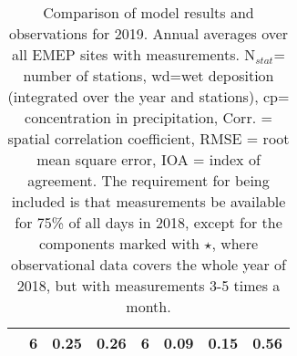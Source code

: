 \begin{table}
\begin{center}
\begin{tabular}{c|ccccccc}
   &  6  &   0.25  &   0.26 &    6 &  0.09 & 0.15 & 0.56\\%
\hline\hline

\end{tabular}

\vspace{0.2cm}

\caption{Comparison of model results and observations for 2019. Annual
averages over all EMEP sites with measurements.  N$_{stat}$= number of stations,
wd=wet deposition (integrated over the year and stations), cp= concentration
in precipitation, Corr. = spatial correlation coefficient, RMSE = root mean
square error, IOA = index of agreement. The requirement for being included
  is that measurements be available for 75\% of all days in 2018, except
  for the components marked with $\star$, where observational data covers
  the whole year of 2018, but with measurements 3-5 times a month.}
\label{tab:tableOldFashioned}
\end{center}
\end{table}







%

